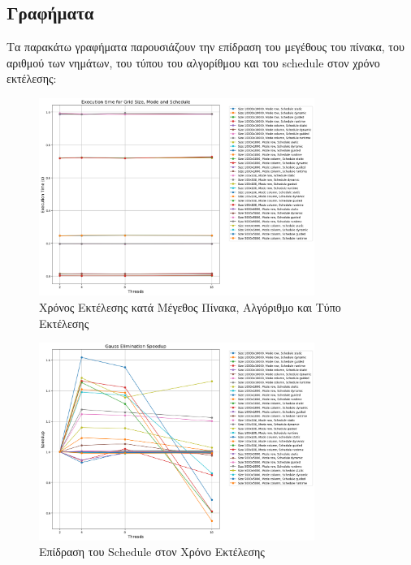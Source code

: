 \documentclass{article}
\begin{document}
\subsection*{Γραφήματα} Τα παρακάτω γραφήματα παρουσιάζουν την επίδραση του μεγέθους του πίνακα, του αριθμού των νημάτων, του τύπου του αλγορίθμου και του schedule στον χρόνο εκτέλεσης:
\begin{figure}[h] 
    \centering 
    \includegraphics[width=0.8\textwidth]{gauss_elimination_results.png} 
    \caption{Χρόνος Εκτέλεσης κατά Μέγεθος Πίνακα, Αλγόριθμο και Τύπο Εκτέλεσης} 
\end{figure}
\begin{figure}[h] 
    \centering 
    \includegraphics[width=0.8\textwidth]{gauss_elimination_speedup.png} 
    \caption{Επίδραση του Schedule στον Χρόνο Εκτέλεσης} 
\end{figure}
\newpage
\end{document}
